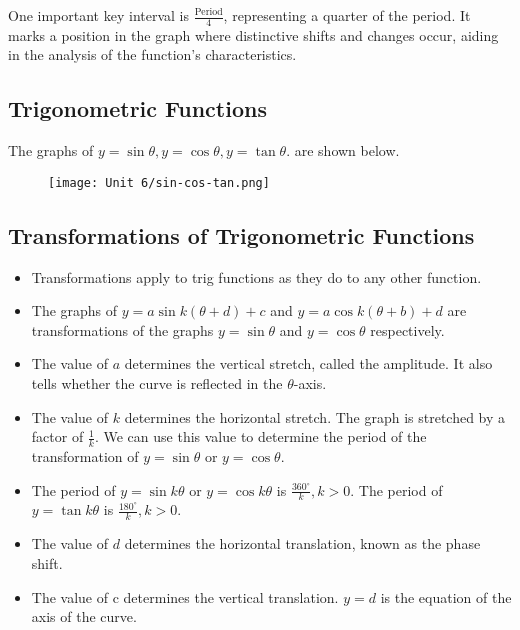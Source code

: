 \documentclass[12pt,a4paper]{article}
\begin{document}
One important key interval is $\frac{\text{Period}}{4}$, representing a quarter of the period. It marks a position in the graph where distinctive shifts and changes occur, aiding in the analysis of the function's characteristics.

\subsection{Trigonometric Functions}
The graphs of $y=\sin\theta, y=\cos\theta, y=\tan\theta.$ are shown below.
\begin{figure}[h]
    \centering
    \texttt{[image: Unit 6/sin-cos-tan.png]}
\end{figure}
\subsection{Transformations of Trigonometric Functions}
\begin{itemize}
    \item Transformations apply to trig functions as they do to any other function.
    \item The graphs of $y=a \sin k(\theta+d)+c$ and $y=a \cos k(\theta+b)+d$ are transformations of the graphs $y=\sin \theta$ and $y=\cos \theta$ respectively.
    \item The value of $a$ determines the vertical stretch, called the amplitude. It also tells whether the curve is reflected in the $\theta$-axis.
    \item The value of $k$ determines the horizontal stretch. The graph is stretched by a factor of $\frac{1}{k}$. We can use this value to determine the period of the transformation of $y=\sin \theta$ or $y=\cos \theta$.
    \item The period of $y=\sin k \theta$ or $y=\cos k \theta$ is $\frac{360^{\circ}}{k}, k>0$. The period of $y=\tan k \theta$ is $\frac{180^{\circ}}{k}, k>0$.
    \item The value of $d$ determines the horizontal translation, known as the phase shift.
    \item The value of $\mathrm{c}$ determines the vertical translation. $y=d$ is the equation of the axis of the curve.
\end{itemize}
\end{document}
